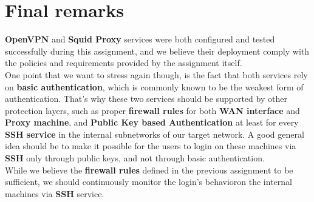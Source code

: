 \section{Final remarks}
\textbf{OpenVPN} and \textbf{Squid Proxy} services were both configured and tested successfully during this assignment, and we believe their deployment comply with the policies and requirements provided by the assignment itself.\\
One point that we want to stress again though, is the fact that both services rely on \textbf{basic authentication}, which is commonly known to be the weakest form of authentication. That's why these two services should be supported by other protection layers, such as proper \textbf{firewall rules} for both \textbf{WAN interface} and \textbf{Proxy machine}, and \textbf{Public Key based Authentication} at least for every \textbf{SSH service} in the internal subnetworks of our target network. A good general idea should be to make it possible for the users to login on these machines via \textbf{SSH} only through public keys, and not through basic authentication.\\
While we believe the \textbf{firewall rules} defined in the previous assignment to be sufficient, we should continuously monitor the login's behavioron the internal machines via \textbf{SSH} service.
